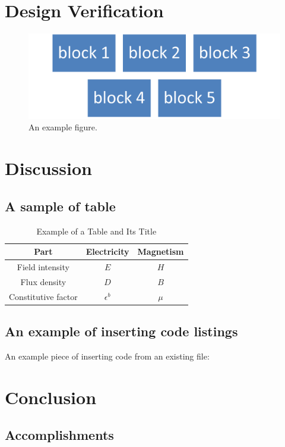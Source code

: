 \documentclass{senior-design}
\begin{document}
\chapter{Design Verification}
\begin{figure}[H]
    \centering
    \includegraphics[width=0.8\linewidth]{figs/Picture1.png}
    \caption{An example figure.}
\end{figure}

\chapter{Discussion}

\section{A sample of table}
\begin{table}[H]
    \centering
    \caption{Example of a Table and Its Title}
    \label{tab:eg-table}
    \begin{tabular}{@{}c|cc@{}}
        \toprule
        Part                & Electricity  & Magnetism \\ \midrule
        Field intensity     & $E$          & $H$       \\
        Flux density        & $D$          & $B$       \\
        Constitutive factor & $\epsilon^b$ & $\mu$     \\ \bottomrule
    \end{tabular}
\end{table}

\section{An example of inserting code listings}
An example piece of inserting code from an existing file:


\chapter{Conclusion}
\section{Accomplishments}
\end{document}
